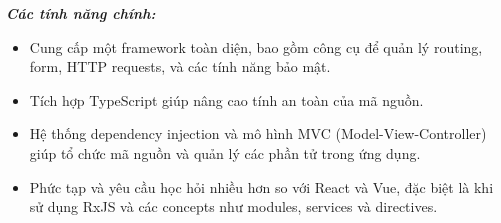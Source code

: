 \par \textbf{\textit{Các tính năng chính:}} \begin{itemize} \item Cung cấp một framework toàn diện, bao gồm công cụ để quản lý routing, form, HTTP requests, và các tính năng bảo mật. \item Tích hợp TypeScript giúp nâng cao tính an toàn của mã nguồn. \item Hệ thống dependency injection và mô hình MVC (Model-View-Controller) giúp tổ chức mã nguồn và quản lý các phần tử trong ứng dụng. \item Phức tạp và yêu cầu học hỏi nhiều hơn so với React và Vue, đặc biệt là khi sử dụng RxJS và các concepts như modules, services và directives. \end{itemize}

